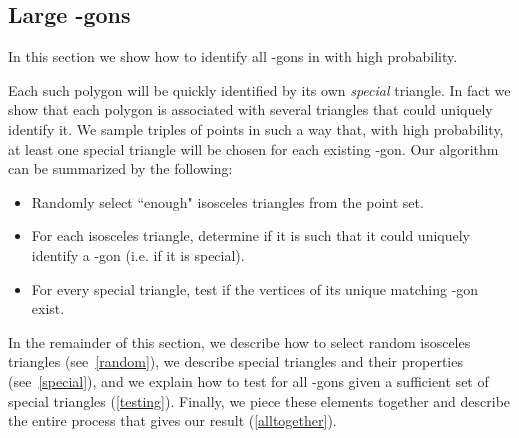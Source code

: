 \documentclass{article}
\begin{document}
\subsection{Large -gons}
\label{subsec:big}
In this section we show how to identify all -gons in  with high probability.

Each such polygon will be quickly identified by its own {\em special} triangle.  In fact we show that each polygon is associated with several triangles that could uniquely identify it.   We sample triples of points in such a way that, with high probability, at least one special triangle will be chosen for each existing
-gon.  Our algorithm can be summarized by the following:
\begin{itemize}
\item
Randomly select ``enough"
isosceles triangles from the point set.
\item
For each isosceles triangle, determine if it is such that it could uniquely identify a -gon (i.e. if it is special).
\item
For every special triangle,  test if the vertices of its unique matching -gon exist.
\end{itemize}

\noindent In the remainder of this section, we describe how to select random isosceles triangles 
(see~\ref{random}),  we describe special triangles and their properties (see~\ref{special}), and
we explain how to test for all -gons given a sufficient set of special triangles (\ref{testing}).
Finally, we piece these elements together and describe the entire process that gives our result
(\ref{alltogether}).
\end{document}
